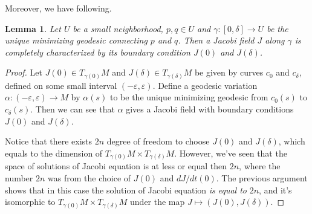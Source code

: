 \documentclass{article}
\newtheorem{lemma}[theorem]{Lemma}
\newcommand{\ep}{\varepsilon}
\newcommand{\g}{\gamma}
\begin{document}
Moreover, we have following.
	\begin{lemma}\rm
	Let $U$ be a small neighborhood, $p,q\in U$ and $\g:[0,\delta]\to U$ be the unique minimizing geodesic connecting $p$ and $q$.
	Then a Jacobi field $J$ along $\g$ is completely characterized by its boundary condition $J(0)$ and $J(\delta)$.
	\end{lemma}
		\begin{proof}
		Let $J(0)\in T_{\g(0)}M$ and $J(\delta)\in T_{\g(\delta)}M$ be given by curves $c_0$ and $c_\delta$, defined on some small interval $(-\ep,\ep)$.
		Define a geodesic variation $\alpha:(-\ep,\ep)\to M$ by $\alpha(s)$ to be the unique minimizing geodesic from $c_0(s)$ to $c_\delta(s)$.
		Then we can see that $\alpha$ gives a Jacobi field with boundary conditions $J(0)$ and $J(\delta)$.
		
		Notice that there exists $2n$ degree of freedom to choose $J(0)$ and $J(\delta)$, which equals to the dimension of $T_{\g(0)}M\times T_{\g(\delta)}M$.
		However, we've seen that the space of solutions of Jacobi equation is at less or equal then $2n$, where the number $2n$ was from the choice of $J(0)$ and $dJ/dt(0)$.
		The previous argument shows that in this case the solution of Jacobi equation \emph{is equal to} $2n$, and it's isomorphic to $T_{\g(0)}M\times T_{\g(\delta)}M$ under the map $J\mapsto (J(0),J(\delta))$.
		\end{proof}
		
		
\end{document}
